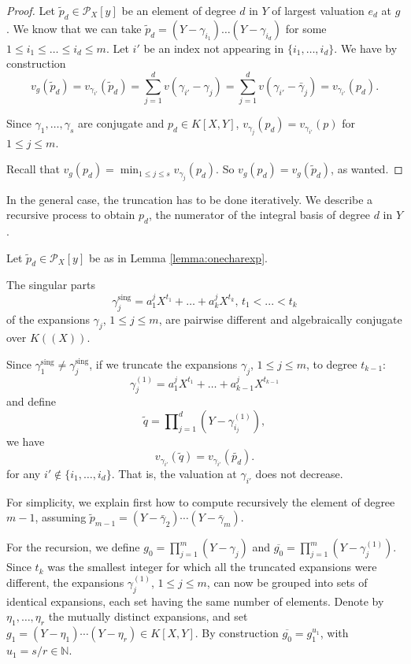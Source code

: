\documentclass[a4paper,11pt]{amsart}%
\theoremstyle{definition}
\theoremstyle{plain}
\theoremstyle{remark}
\newcommand{\Px}{{\mathcal{P}_X}}
\begin{document}
\begin{proof}
Let $\tilde p_d \in \Px[y]$ be an element of degree $d$ in $Y$ of largest valuation $e_d$ at $g$. We know that we can take $\tilde p_d = (Y - \gamma_{i_1}) \dots (Y - \gamma_{i_d})$ for some $1 \le i_1 \le \dots \le i_d \le m$. Let $i'$ be an index not appearing in $\{i_1, \dots, i_d\}$. We have by construction%
\[
v_{g}(\tilde p_d) = v_{\gamma_{i'}}(\tilde p_d) = \sum_{j=1}^{d}v(\gamma_{i'}%
-\gamma_{j}) =\sum_{j=1}^{d}v(\gamma_{i'}-\bar{\gamma}_{j}) = v_{\gamma_{i'}%
}(p_d).
\]

Since $\gamma_{1}, \dots, \gamma_{s}$ are conjugate and $p_d \in K[X,Y]$,
$v_{\gamma_{j}}(p_d) = v_{\gamma_{i'}}(p)$ for $1 \leq j \leq m$. 

Recall that $v_{g}(p_d) = \min_{1 \leq j \leq s} v_{\gamma_{j}}(p_d)$. So
$v_{g}(p_d) = v_{g}(\tilde p_d)$, as wanted.
\end{proof}

In the general case, the truncation has to be done
iteratively. We describe a recursive process to obtain $p_d$, the numerator of the integral basis of degree $d$ in $Y$.

Let $\tilde p_d \in \Px[y]$ be as in Lemma \ref{lemma:onecharexp}.


The singular parts%
\[
\gamma_{j}^{\operatorname{sing}}=a_{1}^{j}X^{t_{1}}+\dots+a_{k}^{j}X^{t_{k}%
}\text{, }t_{1}<...<t_{k}%
\]
of the expansions $\gamma_{j}$, $1 \leq j \leq m$, are pairwise different and
algebraically conjugate over $K((X))$.

Since $\gamma_{1}^{\operatorname{sing}}\neq\gamma_{j}^{\operatorname{sing}}$,
if we truncate the expansions $\gamma_{j}$, $1 \leq j \leq m$, to degree
$t_{k-1}$:
\[
\gamma^{(1)}_{j}=a_{1}^{j}X^{t_{1}}+\dots+a_{k-1}^{j}X^{t_{k-1}}
\]
and define
\[
\tilde q=%
{\textstyle\prod\nolimits_{j=1}^{d}}
(Y-\gamma^{(1)}_{i_j}),
\]
we have%
\[
v_{\gamma_{i'}}(\tilde q)=v_{\gamma_{i'}}(\tilde{p_d}).
\]
for any $i' \not\in \{i_1, \dots, i_d\}$. That is, the valuation at $\gamma_{i'}$ does not decrease.

For simplicity, we explain first how to compute recursively the element of degree $m-1$, assuming $\tilde p_{m-1} = (Y-\bar{\gamma}_{2}) \cdots(Y-\bar{\gamma}_{m})$.

For the recursion, we define $g_{0} = \prod_{j = 1}^{m} (Y-\gamma_{j})$ and
$\overline{g_{0}} = \prod_{j = 1}^{m} (Y-\gamma^{(1)}_{j})$. Since $t_{k}$ was
the smallest integer for which all the truncated expansions were different,
the expansions $\gamma^{(1)}_{j}$, $1 \le j \le m$, can now be grouped into
sets of identical expansions, each set having the same number of elements.
Denote by $\eta_{1},\dots,\eta_{r}$ the mutually distinct expansions, and set
$g_{1}=(Y-\eta_{1})\cdots(Y-\eta_{r}) \in K[X,Y]$. By construction
$\overline{g_{0}} = g_{1}^{u_{1}}$, with $u_{1}=s/r \in{\mathbb{N}}$.
\end{document}
